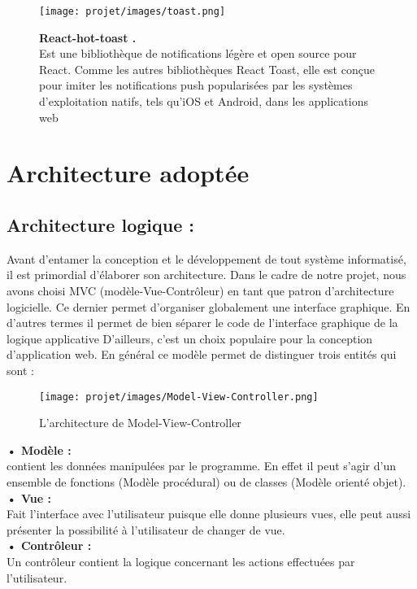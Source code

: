\vspace{0.5cm}
\begin{figure}[H]
    \centering
    \begin{minipage}[c]{0.3\textwidth}
        \texttt{[image: projet/images/toast.png]}
    \end{minipage}
    \hspace{1cm}
    \begin{minipage}[c]{0.6\textwidth}
        \textbf{React-hot-toast .}\\[0.5em]
    Est une bibliothèque de notifications légère et open source pour React. Comme les autres bibliothèques React Toast, elle est conçue pour imiter les notifications push popularisées par les systèmes d'exploitation natifs, tels qu'iOS et Android, dans les applications web \cite{ref26}
    \end{minipage}
\end{figure}
\section{Architecture adoptée}
\subsection{Architecture logique :}
Avant d’entamer la conception et le développement de tout système informatisé, il est primordial d’élaborer son architecture.  Dans le cadre de notre projet,
nous avons choisi MVC (modèle-Vue-Contrôleur) en tant que patron d’architecture logicielle. Ce dernier permet d’organiser globalement une interface
graphique. En d’autres termes il permet de bien séparer le code de l’interface
graphique de la logique applicative D’ailleurs, c’est un choix populaire pour la
conception d’application web. En général ce modèle permet de distinguer trois
entités qui sont :
\begin{figure}[H]
    \centering
    \texttt{[image: projet/images/Model-View-Controller.png]}
    \caption{L’architecture de Model-View-Controller}
    \label{fig:equipe_scrum}
\end{figure}

\textbf{• Modèle :}\\
contient les données manipulées par le programme. En effet il peut s’agir
d’un ensemble de fonctions (Modèle procédural) ou de classes (Modèle
orienté objet).\\
\textbf{• Vue :}\\
Fait l’interface avec l’utilisateur puisque elle donne plusieurs vues, elle
peut aussi présenter la possibilité à l’utilisateur de changer de vue.\\
\textbf{• Contrôleur :}\\
Un contrôleur contient la logique concernant les actions effectuées par
l’utilisateur.

